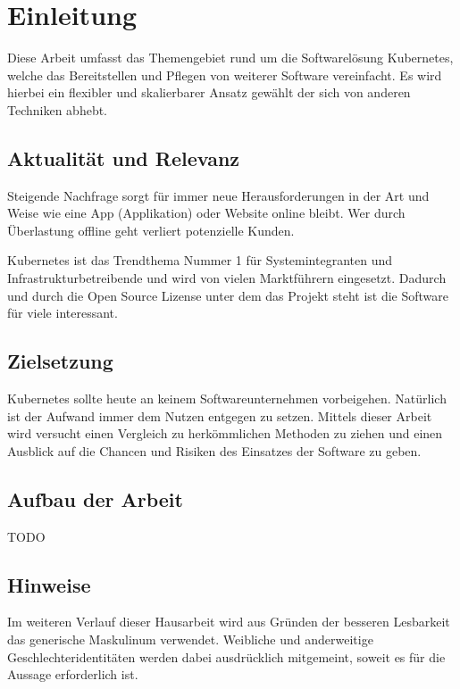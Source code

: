 \section{Einleitung}
Diese Arbeit umfasst das Themengebiet rund um die Softwarelösung Kubernetes, welche das Bereitstellen und Pflegen von weiterer Software vereinfacht. 
Es wird hierbei ein flexibler und skalierbarer Ansatz gewählt der sich von anderen Techniken abhebt.

\subsection{Aktualität und Relevanz}
Steigende Nachfrage sorgt für immer neue Herausforderungen in der Art und Weise wie eine App (Applikation) oder Website online bleibt. Wer durch Überlastung offline geht verliert potenzielle Kunden.

Kubernetes ist das Trendthema Nummer 1 für Systemintegranten und Infrastrukturbetreibende und wird von vielen Marktführern eingesetzt. Dadurch und durch die Open Source Lizense unter dem das Projekt steht
ist die Software für viele interessant.

\subsection{Zielsetzung}
Kubernetes sollte heute an keinem Softwareunternehmen vorbeigehen. Natürlich ist der Aufwand immer dem Nutzen entgegen zu setzen. Mittels dieser Arbeit wird versucht einen Vergleich zu 
herkömmlichen Methoden zu ziehen und einen Ausblick auf die Chancen und Risiken des Einsatzes der Software zu geben.

\subsection{Aufbau der Arbeit}
TODO

\subsection{Hinweise}
Im weiteren Verlauf dieser Hausarbeit wird aus Gründen der besseren Lesbarkeit das generische Maskulinum verwendet. Weibliche und anderweitige Geschlechteridentitäten werden dabei ausdrücklich mitgemeint, soweit es für die Aussage erforderlich ist.

